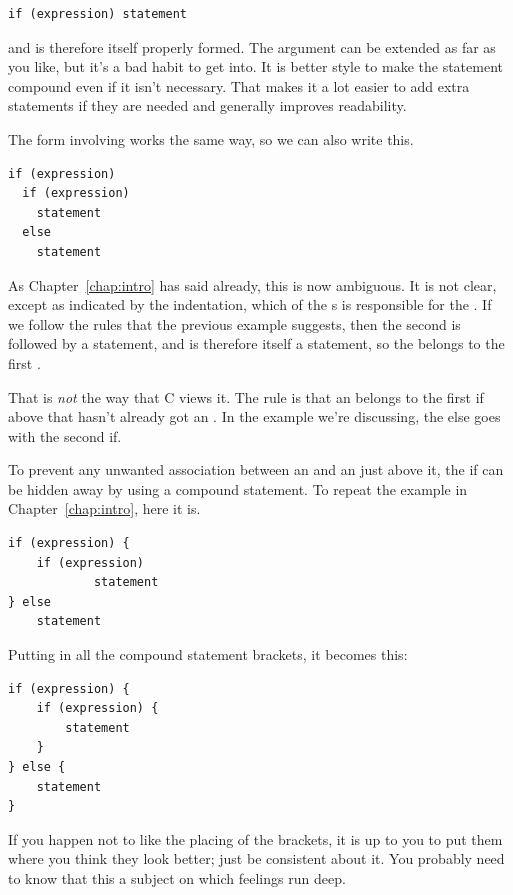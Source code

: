    \begin{Verbatim}
if (expression) statement
\end{Verbatim}

   and is therefore itself properly formed. The argument can be extended as
    far as you like, but it's a bad habit to get into. It is better style to
    make the statement compound even if it isn't necessary. That makes it a
    lot easier to add extra statements if they are needed and generally
    improves readability.


   The form involving \kelse{} works the same way, so we can also
    write this.


   \begin{Verbatim}
if (expression)
  if (expression)
    statement
  else
    statement
\end{Verbatim}

   As Chapter~\ref{chap:intro} has said already, this is now ambiguous. It is
    not clear, except as indicated by the indentation, which of the
    \kif{}s is responsible for the \kelse. If we follow
    the rules that the previous example suggests, then the second
    \kif{} is followed by a statement, and is therefore itself a
    statement, so the \kelse{} belongs to the first
    \kif.


   That is \textit{not} the way that C views it. The rule is that an
    \kelse{} belongs to the first if above that hasn't already got an
    \kelse. In the example we're discussing, the else goes with the
    second if.


   To prevent any unwanted association between an \kelse{} and an
    \kif{} just above it, the if can be hidden away by using a
    compound statement.
    To repeat the example in Chapter~\ref{chap:intro}, here it is.

   \begin{Verbatim}
if (expression) {
    if (expression)
            statement
} else
    statement
\end{Verbatim}

   Putting in all the compound statement brackets, it becomes this:


   \begin{Verbatim}
if (expression) {
    if (expression) {
        statement
    }
} else {
    statement
}
\end{Verbatim}

   If you happen not to like the placing of the brackets, it is up to you
    to put them where you think they look better; just be consistent about it.
    You probably need to know that this a subject on which feelings run
    deep.



